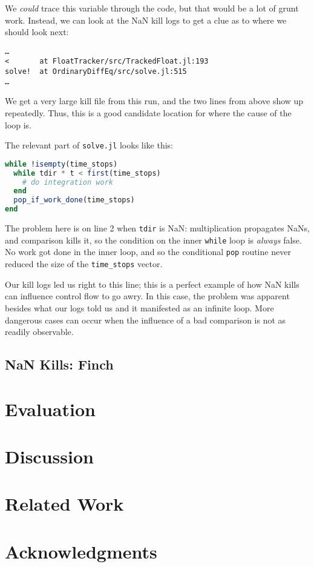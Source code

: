 \documentclass{juliacon}
\begin{document}
We \emph{could} trace this variable through the code, but that would be a lot of grunt work.
Instead, we can look at the NaN kill logs to get a clue as to where we should look next:

\begin{verbatim}
…
<       at FloatTracker/src/TrackedFloat.jl:193
solve!  at OrdinaryDiffEq/src/solve.jl:515
…
\end{verbatim}

We get a very large kill file from this run, and the two lines from above show up repeatedly.
Thus, this is a good candidate location for where the cause of the loop is.

The relevant part of \texttt{solve.jl} looks like this:


\begin{lstlisting}[language = Julia]
while !isempty(time_stops)
  while tdir * t < first(time_stops)
    # do integration work
  end
  pop_if_work_done(time_stops)
end
\end{lstlisting}

The problem here is on line 2 when \texttt{tdir} is NaN: multiplication propagates NaNs, and comparison kills it, so the condition on the inner \texttt{while} loop is \emph{always} false.
No work got done in the inner loop, and so the conditional \texttt{pop} routine never reduced the size of the \texttt{time\_stops} vector.

Our kill logs led us right to this line; this is a perfect example of how NaN kills can influence control flow to go awry.
In this case, the problem was apparent besides what our logs told us and it manifested as an infinite loop.
More dangerous cases can occur when the influence of a bad comparison is not as readily observable.

\subsection{NaN Kills: Finch}


\section{Evaluation}

\section{Discussion}

\section{Related Work}

\section{Acknowledgments}


\end{document}

